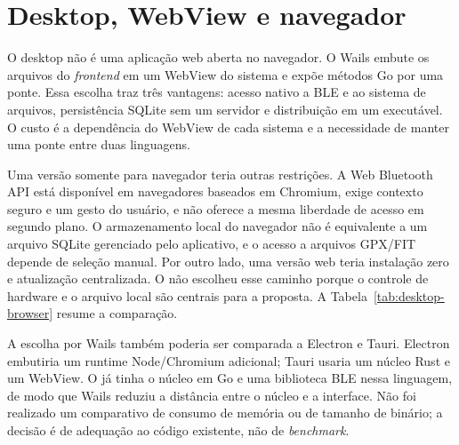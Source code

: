 \section{Desktop, WebView e navegador}
\label{sec:desktop-browser}

O \argus{} desktop não é uma aplicação web aberta no navegador. O Wails embute
os arquivos do \textit{frontend} em um WebView do sistema e expõe métodos Go
por uma ponte. Essa escolha traz três vantagens: acesso nativo a BLE e ao
sistema de arquivos, persistência SQLite sem um servidor e distribuição em um
executável. O custo é a dependência do WebView de cada sistema e a necessidade
de manter uma ponte entre duas linguagens.

Uma versão somente para navegador teria outras restrições. A Web Bluetooth API
está disponível em navegadores baseados em Chromium, exige contexto seguro e
um gesto do usuário, e não oferece a mesma liberdade de acesso em segundo
plano. O armazenamento local do navegador não é equivalente a um arquivo
SQLite gerenciado pelo aplicativo, e o acesso a arquivos GPX/FIT depende de
seleção manual. Por outro lado, uma versão web teria instalação zero e
atualização centralizada. O \argus{} não escolheu esse caminho porque o controle
de hardware e o arquivo local são centrais para a proposta. A
Tabela~\ref{tab:desktop-browser} resume a comparação.

A escolha por Wails também poderia ser comparada a Electron e Tauri. Electron
embutiria um runtime Node/Chromium adicional; Tauri usaria um núcleo Rust e um
WebView. O \argus{} já tinha o núcleo em Go e uma biblioteca BLE nessa
linguagem, de modo que Wails reduziu a distância entre o núcleo e a interface.
Não foi realizado um comparativo de consumo de memória ou de tamanho de
binário; a decisão é de adequação ao código existente, não de \textit{benchmark}.

